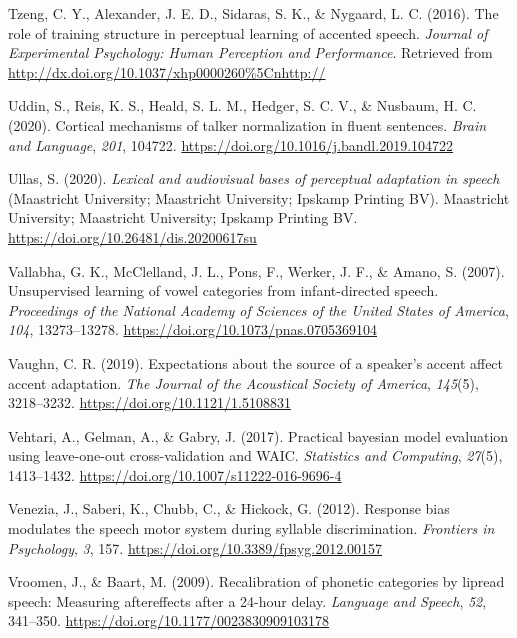 \documentclass[
  11pt,
  english,
  man,floatsintext]{apa6}
\newlength{\cslhangindent}
\newlength{\cslentryspacingunit} %
\newenvironment{CSLReferences}[2] %
 {%
  \setlength{\parindent}{0pt}
  \ifodd #1
  \let\oldpar\par
  \def\par{\hangindent=\cslhangindent\oldpar}
  \fi
  \setlength{\parskip}{#2\cslentryspacingunit}
 }%
 {}
\begin{document}
\begin{CSLReferences}{1}{0}
\leavevmode{}%
Tzeng, C. Y., Alexander, J. E. D., Sidaras, S. K., \& Nygaard, L. C. (2016). The role of training structure in perceptual learning of accented speech. \emph{Journal of Experimental Psychology: Human Perception and Performance}. Retrieved from \url{http://dx.doi.org/10.1037/xhp0000260\%5Cnhttp://}

\leavevmode{}%
Uddin, S., Reis, K. S., Heald, S. L. M., Hedger, S. C. V., \& Nusbaum, H. C. (2020). Cortical mechanisms of talker normalization in fluent sentences. \emph{Brain and Language}, \emph{201}, 104722. \url{https://doi.org/10.1016/j.bandl.2019.104722}

\leavevmode{}%
Ullas, S. (2020). \emph{Lexical and audiovisual bases of perceptual adaptation in speech} (Maastricht University; Maastricht University; Ipskamp Printing BV). Maastricht University; Maastricht University; Ipskamp Printing BV. \url{https://doi.org/10.26481/dis.20200617su}

\leavevmode{}%
Vallabha, G. K., McClelland, J. L., Pons, F., Werker, J. F., \& Amano, S. (2007). Unsupervised learning of vowel categories from infant-directed speech. \emph{Proceedings of the National Academy of Sciences of the United States of America}, \emph{104}, 13273--13278. \url{https://doi.org/10.1073/pnas.0705369104}

\leavevmode{}%
Vaughn, C. R. (2019). Expectations about the source of a speaker's accent affect accent adaptation. \emph{The Journal of the Acoustical Society of America}, \emph{145}(5), 3218--3232. \url{https://doi.org/10.1121/1.5108831}

\leavevmode{}%
Vehtari, A., Gelman, A., \& Gabry, J. (2017). Practical bayesian model evaluation using leave-one-out cross-validation and WAIC. \emph{Statistics and Computing}, \emph{27}(5), 1413--1432. \url{https://doi.org/10.1007/s11222-016-9696-4}

\leavevmode{}%
Venezia, J., Saberi, K., Chubb, C., \& Hickock, G. (2012). Response bias modulates the speech motor system during syllable discrimination. \emph{Frontiers in Psychology}, \emph{3}, 157. \url{https://doi.org/10.3389/fpsyg.2012.00157}

\leavevmode{}%
Vroomen, J., \& Baart, M. (2009). Recalibration of phonetic categories by lipread speech: Measuring aftereffects after a 24-hour delay. \emph{Language and Speech}, \emph{52}, 341--350. \url{https://doi.org/10.1177/0023830909103178}


\end{CSLReferences}
\end{document}
